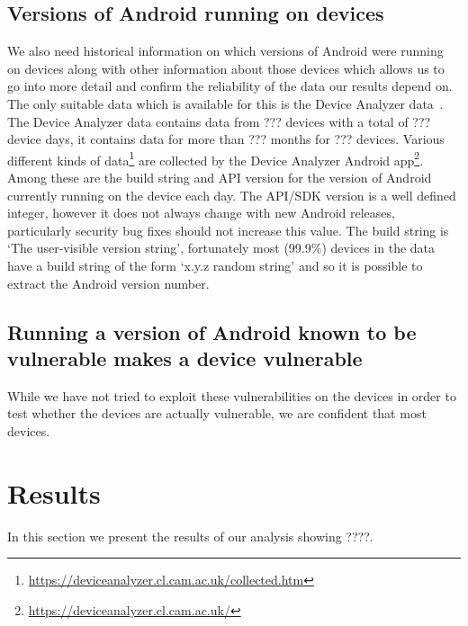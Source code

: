 \documentclass[conference,a4paper,twoside]{IEEEtran}
\begin{document}
\subsection{Versions of Android running on devices}
We also need historical information on which versions of Android were running on devices along with other information about those devices which allows us to go into more detail and confirm the reliability of the data our results depend on.
The only suitable data which is available for this is the Device Analyzer data~\cite{Wagner2013}.
The Device Analyzer data contains data from ??? devices with a total of ??? device days, it contains data for more than ??? months for ??? devices.
Various different kinds of data\footnote{\url{https://deviceanalyzer.cl.cam.ac.uk/collected.htm}} are collected by the Device Analyzer Android app\footnote{\url{https://deviceanalyzer.cl.cam.ac.uk/}}.
Among these are the build string and API version for the version of Android currently running on the device each day.
The API/SDK version is a well defined integer, however it does not always change with new Android releases, particularly security bug fixes should not increase this value.
The build string is `The user-visible version string', fortunately most (99.9\%) devices in the data have a build string of the form `x.y.z random string' and so it is possible to extract the Android version number.

\subsection{Running a version of Android known to be vulnerable makes a device vulnerable}
While we have not tried to exploit these vulnerabilities on the devices in order to test whether the devices are actually vulnerable, we are confident that most devices.

\section{Results}
\label{sec:results}
In this section we present the results of our analysis showing ????. %
\end{document}
